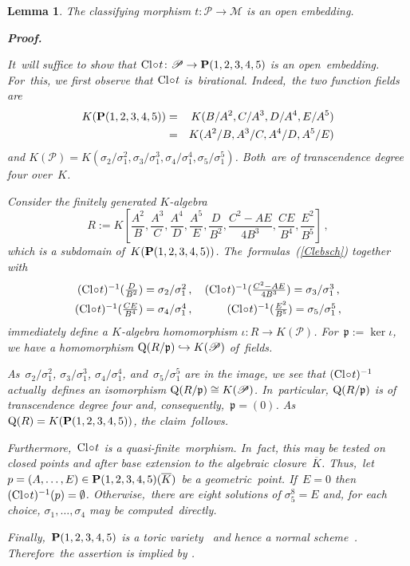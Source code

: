 \documentclass[reqno]{amsart}
\newtheorem{lem}[theorem]{Lemma}
\theoremstyle{definition}
\theoremstyle{remark}
\numberwithin{equation}{section}
\newcommand{\calM}{\mathscr{M}}
\newcommand{\calP}{\mathscr{P}}
\newcommand{\frakp}{\mathfrak{p}}
\newcommand{\Q}{{\rm Q}}
\newcommand{\Cl}{{\rm Cl}}
\newcommand{\bP}{{\bf P}}
\def\rightend#1#2{{%
 \leavevmode\nobreak\hskip .5em plus 1fil
 \penalty600 \hskip 0pt plus -1filll
 \vadjust{}\nobreak\hskip 0pt plus 1filll%
 #1\parfillskip=#2\relax \par}}
\def\eop{\ifmmode\rule[-22pt]{0pt}{1pt}\ifinner\tag*{$\square$}\else\eqno{\square}\fi\else\rightend{$\square$}{0pt}\fi}
\begin{document}
\begin{lem}\smallskip
The classifying morphism\/
$t\colon \calP \to \calM$
is an open embedding.\smallskip

\noindent
{\bf Proof.}
{\em
It~will suffice to show that
$\Cl \!\circ\! t \colon \calP \to \bP(1,2,3,4,5)$
is an open~embedding. For~this, we first observe that
$\Cl \!\circ\! t$
is~birational. Indeed,~the two function fields are
\begin{eqnarray*}
K(\bP(1,2,3,4,5)) & = & K(B/A^2, C/A^3, D/A^4, E/A^5) \\
 & = & K(A^2/B, A^3/C, A^4/D, A^5/E)
\end{eqnarray*}
and
$K(\calP) = K(\sigma_2/\sigma_1^2, \sigma_3/\sigma_1^3, \sigma_4/\sigma_1^4, \sigma_5/\sigma_1^5)$.
Both~are of transcendence degree four
over~$K$.

Consider the finitely generated
\mbox{$K$-algebra}
$$R := K[\frac{A^2}B, \!\frac{A^3}C, \!\frac{A^4}D\!, \!\frac{A^5}E\!, \!\frac{D}{B^2}, \!\frac{C^2-AE}{4B^3}, \!\frac{CE}{B^4}, \!\frac{E^2}{B^5}] \, ,$$
which is a subdomain
of~$K(\bP(1,2,3,4,5))$.
The~formulas~(\ref{Clebsch}) together with
\begin{align*}
\textstyle
(\Cl \!\circ\! t)^{-1} (\frac{D}{B^2}) = \sigma_2/\sigma_1^2& \, , \quad
\textstyle
(\Cl \!\circ\! t)^{-1} (\frac{C^2-AE}{4B^3}) = \sigma_3/\sigma_1^3 \, , \\
\textstyle
(\Cl \!\circ\! t)^{-1} (\frac{CE}{B^4}) = \sigma_4/\sigma_1^4& \, , \quad
\textstyle
\hspace{0.7cm} (\Cl \!\circ\! t)^{-1} (\frac{E^2}{B^5}) = \sigma_5/\sigma_1^5 \, ,
\end{align*}
immediately define a
\mbox{$K$-algebra}
homomorphism
$\iota\colon R \to K(\calP)$.
For~$\frakp := \ker\iota$,
we have a homomorphism
$\Q(R/\frakp) \hookrightarrow K(\calP)$
of~fields.

As~$\sigma_2/\sigma_1^2$,
$\sigma_3/\sigma_1^3$,
$\sigma_4/\sigma_1^4$,
and~$\sigma_5/\sigma_1^5$
are in the image, we see that
$(\Cl \!\circ\! t)^{-1}$
actually~defines an isomorphism
$\Q(R/\frakp) \cong K(\calP)$.
In~particular,
$\Q(R/\frakp)$
is of transcendence degree four and,
consequently,~$\frakp = (0)$.
As~$\Q(R) = K(\bP(1,2,3,4,5))$,
the claim~follows.

Furthermore,~$\Cl \!\circ\! t$
is a quasi-finite~morphism. In~fact, this may be tested on closed points and after base extension to the algebraic
closure~$\overline{K}$.
Thus,~let
$p = (A, \ldots, E) \in \bP(1,2,3,4,5)(\overline{K})$
be a geometric~point.
If~$E = 0$
then
$(\Cl \!\circ\! t)^{-1}(p) = \emptyset$.
Otherwise,~there are eight solutions of
$\sigma_5^8 = E$
and, for each choice,
$\sigma_1, \ldots, \sigma_4$
may be computed~directly.

Finally,~$\bP(1,2,3,4,5)$
is a toric variety~\cite[section~2.2, page~35]{Fu} and hence a normal scheme~\cite[section~2.1, page~29]{Fu}. Therefore~the assertion is implied by \cite[Corollaire~(4.4.9)]{EGAIII}.
}
\eop
\end{lem}
\end{document}
